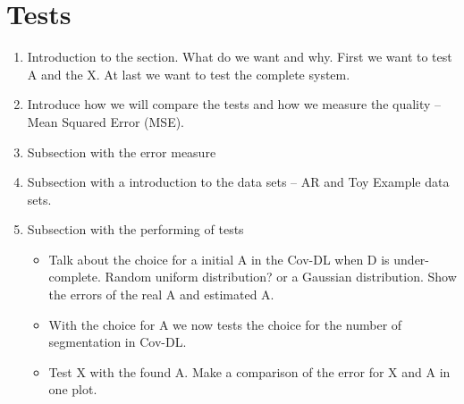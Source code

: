 \section{Tests}
\begin{enumerate}
\item Introduction to the section. What do we want and why. First we want to test A and the X. At last we want to test the complete system.
\item Introduce how we will compare the tests and how we measure the quality -- Mean Squared Error (MSE).
\item Subsection with the error measure
\item Subsection with a introduction to the data sets -- AR and Toy Example data sets.
\item Subsection with the performing of tests
	\begin{itemize}
	\item Talk about the choice for a initial A in the Cov-DL when D is under-complete. Random uniform distribution? or a Gaussian distribution. Show the errors of the real A and estimated A.
	\item With the choice for A we now tests the choice for the number of segmentation in Cov-DL.
	\item Test X with the found A. Make a comparison of the error for X and A in one plot.
	\end{itemize}
\end{enumerate}
   

